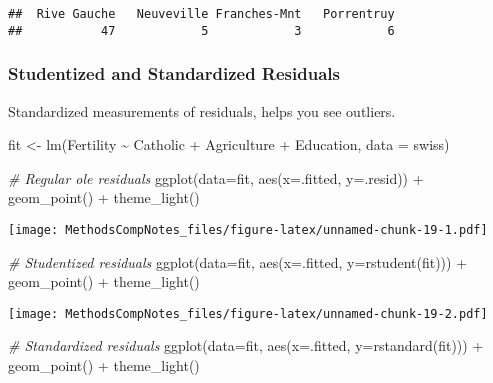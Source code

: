\documentclass[
]{article}
\newenvironment{Shaded}{\begin{snugshade}}{\end{snugshade}}
\newcommand{\AttributeTok}[1]{\textcolor[rgb]{0.77,0.63,0.00}{#1}}
\newcommand{\CommentTok}[1]{\textcolor[rgb]{0.56,0.35,0.01}{\textit{#1}}}
\newcommand{\FunctionTok}[1]{\textcolor[rgb]{0.00,0.00,0.00}{#1}}
\newcommand{\NormalTok}[1]{#1}
\newcommand{\OtherTok}[1]{\textcolor[rgb]{0.56,0.35,0.01}{#1}}
\newcommand{\SpecialCharTok}[1]{\textcolor[rgb]{0.00,0.00,0.00}{#1}}
\begin{document}
\begin{verbatim}
##  Rive Gauche   Neuveville Franches-Mnt   Porrentruy 
##           47            5            3            6
\end{verbatim}

\hypertarget{studentized-and-standardized-residuals}{%
\subsubsection{Studentized and Standardized
Residuals}\label{studentized-and-standardized-residuals}}

Standardized measurements of residuals, helps you see outliers.

\begin{Shaded}
\begin{Highlighting}[]
\NormalTok{fit }\OtherTok{\textless{}{-}} \FunctionTok{lm}\NormalTok{(Fertility }\SpecialCharTok{\textasciitilde{}}\NormalTok{ Catholic }\SpecialCharTok{+}\NormalTok{ Agriculture }\SpecialCharTok{+}\NormalTok{ Education, }\AttributeTok{data =}\NormalTok{ swiss)}

\CommentTok{\# Regular ole residuals}
\FunctionTok{ggplot}\NormalTok{(}\AttributeTok{data=}\NormalTok{fit, }\FunctionTok{aes}\NormalTok{(}\AttributeTok{x=}\NormalTok{.fitted, }\AttributeTok{y=}\NormalTok{.resid)) }\SpecialCharTok{+}
  \FunctionTok{geom\_point}\NormalTok{() }\SpecialCharTok{+}
  \FunctionTok{theme\_light}\NormalTok{()}
\end{Highlighting}
\end{Shaded}

\texttt{[image: MethodsCompNotes\_files/figure-latex/unnamed-chunk-19-1.pdf]}

\begin{Shaded}
\begin{Highlighting}[]
\CommentTok{\# Studentized residuals}
\FunctionTok{ggplot}\NormalTok{(}\AttributeTok{data=}\NormalTok{fit, }\FunctionTok{aes}\NormalTok{(}\AttributeTok{x=}\NormalTok{.fitted, }\AttributeTok{y=}\FunctionTok{rstudent}\NormalTok{(fit))) }\SpecialCharTok{+}
  \FunctionTok{geom\_point}\NormalTok{() }\SpecialCharTok{+}
  \FunctionTok{theme\_light}\NormalTok{()}
\end{Highlighting}
\end{Shaded}

\texttt{[image: MethodsCompNotes\_files/figure-latex/unnamed-chunk-19-2.pdf]}

\begin{Shaded}
\begin{Highlighting}[]
\CommentTok{\# Standardized residuals}
\FunctionTok{ggplot}\NormalTok{(}\AttributeTok{data=}\NormalTok{fit, }\FunctionTok{aes}\NormalTok{(}\AttributeTok{x=}\NormalTok{.fitted, }\AttributeTok{y=}\FunctionTok{rstandard}\NormalTok{(fit))) }\SpecialCharTok{+}
  \FunctionTok{geom\_point}\NormalTok{() }\SpecialCharTok{+}
  \FunctionTok{theme\_light}\NormalTok{()}
\end{Highlighting}
\end{Shaded}
\end{document}
